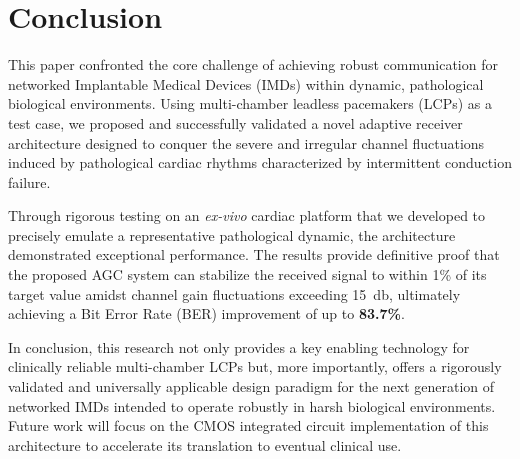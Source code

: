 \documentclass[journal]{IEEEtran}
\begin{document}
\section{Conclusion}
\label{sec:conclusion}

This paper confronted the core challenge of achieving robust communication for networked Implantable Medical Devices (IMDs) within dynamic, pathological biological environments. Using multi-chamber leadless pacemakers (LCPs) as a test case, we proposed and successfully validated a novel adaptive receiver architecture designed to conquer the severe and irregular channel fluctuations induced by pathological cardiac rhythms characterized by intermittent conduction failure.


Through rigorous testing on an \textit{ex-vivo} cardiac platform that we developed to precisely emulate a representative pathological dynamic, the architecture demonstrated exceptional performance. The results provide definitive proof that the proposed AGC system can stabilize the received signal to within 1\% of its target value amidst channel gain fluctuations exceeding \SI{15}{\decibel}, ultimately achieving a Bit Error Rate (BER) improvement of up to \textbf{83.7\%}.

In conclusion, this research not only provides a key enabling technology for clinically reliable multi-chamber LCPs but, more importantly, offers a rigorously validated and universally applicable design paradigm for the next generation of networked IMDs intended to operate robustly in harsh biological environments. Future work will focus on the CMOS integrated circuit implementation of this architecture to accelerate its translation to eventual clinical use.








\end{document}
